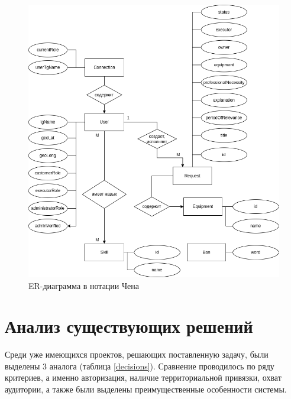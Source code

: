 \begin{figure}[H]
	\begin{center}
		\includegraphics[scale=0.6]{assets/ER-Chen.png}
	\end{center}
	\caption{ER-диаграмма в нотации Чена}
	\label{er-chen}
\end{figure}

\section{Анализ существующих решений}

Среди уже имеющихся проектов, решающих поставленную задачу, были выделены 3 аналога (таблица \ref{decisions}). Сравнение проводилось по ряду критериев, а именно авторизация, наличие территориальной привязки, охват аудитории, а также были выделены преимущественные особенности системы.

